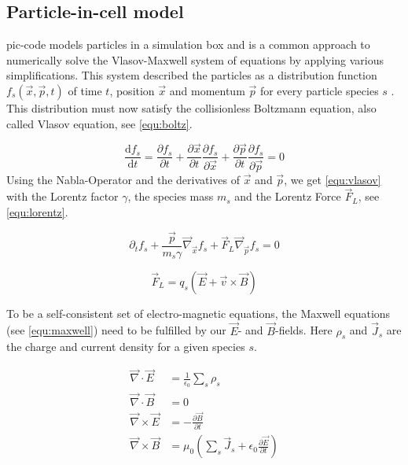 \documentclass[bachelor_thesis]{subfiles}
\begin{document}
\subsection{Particle-in-cell model} \label{chap:pic}
\Gls{pic}-code models particles in a simulation box and is a common approach to numerically solve the Vlasov-Maxwell system of equations by applying various simplifications. This system described the particles as a distribution function $f_s(\vec{x}, \vec{p}, t)$ of time $t$, position $\vec{x}$ and momentum $\vec{p}$ for every particle species $s$ \cite{PICRepo, Derouillat2017}.
This distribution must now satisfy the collisionless Boltzmann equation, also called Vlasov equation\cite{Vlasov1968}, see \autoref{equ:boltz}.

\begin{equation}
	\frac{\mathrm{d}f_s}{\mathrm{d}t}=\frac{\partial f_s}{\partial t} + \frac{\partial \vec{x}}{\partial t} \frac{\partial f_s}{\partial \vec{x}} + \frac{\partial \vec{p}}{\partial t} \frac{\partial f_s}{\partial \vec{p}} = 0
	\label{equ:boltz}
\end{equation}
Using the Nabla-Operator and the derivatives of $\vec{x}$ and $\vec{p}$, we get \autoref{equ:vlasov} with the Lorentz factor $\gamma$, the species mass $m_s$ and the Lorentz Force $\vec{F}_L$, see \autoref{equ:lorentz}.

\begin{equation}
	\partial_t f_s + \frac{\vec{p}}{m_s \gamma} \vec{\nabla}_{\vec{x}} f_s + \vec{F}_L \vec{\nabla}_{\vec{p}} f_s = 0
	\label{equ:vlasov}
\end{equation}

\begin{equation}
	\vec{F}_L=q_s\left(\vec{E}+\vec{v}\times\vec{B}\right)
	\label{equ:lorentz}
\end{equation}

To be a self-consistent set of electro-magnetic equations, the Maxwell equations (see \autoref{equ:maxwell}) need to be fulfilled by our $\vec{E}$- and $\vec{B}$-fields. Here $\rho_s$ and $\vec{J}_s$ are the charge and current density for a given species $s$.

\begin{equation}
\begin{aligned}
	\vec{\nabla}\cdotp\vec{E}  &= \frac{1}{\epsilon_0}\sum_s \rho_s 									\\
	\vec{\nabla}\cdotp\vec{B}  &= 0 														\\
	\vec{\nabla}\times\vec{E} &= -\frac{\partial \vec{B}}{\partial t}									\\
	\vec{\nabla}\times\vec{B}&= \mu_0 \left(\sum_s \vec{J}_s + \epsilon_0 \frac{\partial \vec{E}}{\partial t}\right)	
\end{aligned}
\label{equ:maxwell}
\end{equation}
\end{document}
